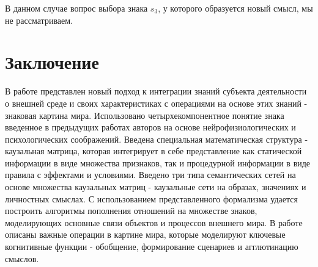\documentclass[12pt]{scrartcl}
\begin{document}
	В данном случае вопрос выбора знака $s_3$, у которого образуется новый смысл, мы не рассматриваем.
	
	\section*{Заключение}
	В работе представлен новый подход к интеграции знаний субъекта деятельности о внешней среде и своих характеристиках с операциями на основе этих знаний - знаковая картина мира. Использовано четырхекомпонентное понятие знака введенное в предыдущих работах авторов на основе нейрофизиологических и психологических соображений. Введена специальная математическая структура - каузальная матрица, которая интегрирует в себе представление как статической информации в виде множества признаков, так и процедурной информации в виде правила с эффектами и условиями. Введено три типа семантических сетей на основе множества каузальных матриц - каузальные сети на образах, значениях и личностных смыслах. С использованием представленного формализма удается построить алгоритмы пополнения отношений на множестве знаков, моделирующих основные связи объектов и процессов внешнего мира. В работе описаны важные операции в картине мира, которые моделируют ключевые когнитивные функции - обобщение, формирование сценариев и агглютинацию смыслов.
	
	\printbibliography
\end{document}
